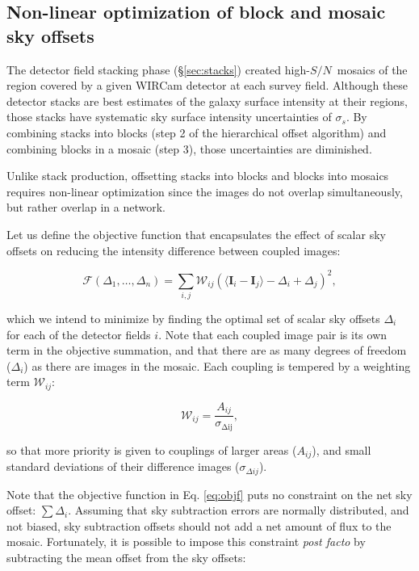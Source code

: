 \documentclass[iop]{emulateapj}
\newcommand{\vect}[1]{\boldsymbol{#1}} %
\newcommand{\sn}{\ensuremath{S/N}} %
\begin{document}
\subsection{Non-linear optimization of block and mosaic sky offsets}

The detector field stacking phase (\S \ref{sec:stacks}) created high-\sn\ mosaics of the region covered by a given WIRCam detector at each survey field. Although these detector stacks are best estimates of the galaxy surface intensity at their regions, those stacks have systematic sky surface intensity uncertainties of $\sigma_s$. By combining stacks into blocks (step 2 of the hierarchical offset algorithm) and combining blocks in a mosaic (step 3), those uncertainties are diminished.

Unlike stack production, offsetting stacks into blocks and blocks into mosaics requires non-linear optimization since the images do not overlap simultaneously, but rather overlap in a network.

Let us define the objective function that encapsulates the effect of scalar sky offsets on reducing the intensity difference between coupled images:

\begin{equation}
    \mathcal{F} \left(\Delta_1,\ldots,\Delta_n \right) = \sum_{i,j} \mathcal{W}_{ij} \left( \langle \vect{I}_i - \vect{I}_j \rangle - \Delta_i + \Delta_j \right)^2,
    \label{eq:objf}
\end{equation}

\noindent which we intend to minimize by finding the optimal set of scalar sky offsets $\Delta_i$ for each of the detector fields $i$. Note that each coupled image pair is its own term in the objective summation, and that there are as many degrees of freedom ($\Delta_i$) as there are images in the mosaic. Each coupling is tempered by a weighting term $\mathcal{W}_{ij}$:

\begin{equation}
    \mathcal{W}_{ij} = \frac{A_{ij}}{\sigma_{\mathrm{\Delta ij}}},
\end{equation}

\noindent so that more priority is given to couplings of larger areas ($A_{ij}$), and small standard deviations of their difference images ($\sigma_{\Delta ij}$).

Note that the objective function in Eq. \ref{eq:objf} puts no constraint on the net sky offset: $\sum \Delta_i$. Assuming that sky subtraction errors are normally distributed, and not biased, sky subtraction offsets should not add a net amount of flux to the mosaic. Fortunately, it is possible to impose this constraint \textit{post facto} by subtracting the mean offset from the sky offsets:
\end{document}
